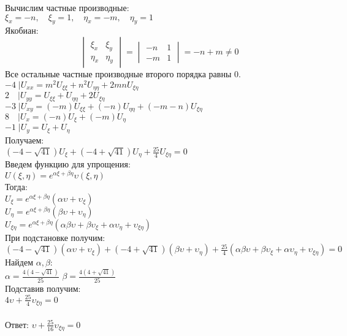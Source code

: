 \documentclass{article}
\begin{document}
	Вычислим частные производные: \\
	$\xi_x=-n, \quad\xi_y=1, \quad \eta_x=-m,\quad \eta_y=1$\\
	Якобиан: \\ 
	\begin{equation}
		\begin{vmatrix}
			\xi_x & \xi_y \\
			\eta_x & \eta_y
		\end{vmatrix}
	    =
		\begin{vmatrix}
			-n & 1 \\
			-m & 1
		\end{vmatrix}
		=
		-n + m
		\neq
		0
	\end{equation}
	Все остальные частные производные второго порядка равны 0.\\
	$ -4\;|U_{xx}=m^2U_{\xi\xi}+n^2U_{\eta\eta}+2mnU_{\xi\eta} $ \\
	$ 2 \quad|U_{yy}=U_{\xi\xi}+U_{\eta\eta}+2U_{\xi\eta} $ \\
	$ -3\;|U_{xy}=(-m)U_{\xi\xi}+(-n)U_{\eta\eta}+(-m-n)U_{\xi\eta} $ \\
	$ 8 \quad|U_x=(-n)U_{\xi}+(-m)U_{\eta} $ \\
	$-1\;|U_y=U_{\xi}+U_{\eta}$ \\
	Получаем: \\
	$ (-4 - \sqrt{41}) U_{\xi} + (-4 + \sqrt{41})U_{\eta} + \frac{25}{4}U_{\xi \eta} = 0 $ \\
	Введем функцию для упрощения: \\
	$U(\xi,\eta)=e^{\alpha\xi +\beta\eta}\upsilon(\xi,\eta)$\\
	Тогда:\\
	$U_{\xi}=e^{\alpha\xi +\beta\eta}(\alpha\upsilon+\upsilon_{\xi})$\\
	$U_{\eta}=e^{\alpha\xi +\beta\eta}(\beta\upsilon+\upsilon_{\eta})$\\
	$U_{\xi \eta}=e^{\alpha\xi +\beta\eta}(\alpha\beta\upsilon+\beta\upsilon_{\xi}+\alpha\upsilon_{\eta}+\upsilon_{\xi\eta})$\\
	При подстановке получим:\\
	$(-4 - \sqrt{41})(\alpha\upsilon+\upsilon_{\xi}) +(-4 + \sqrt{41})(\beta\upsilon+\upsilon_{\eta}) + \frac{25}{4}(\alpha\beta\upsilon+\beta\upsilon_{\xi}+\alpha\upsilon_{\eta}+\upsilon_{\xi\eta}) = 0 $ \\
	Найдем $ \alpha , \beta: $ \\
	$\alpha=\frac{4(4 - \sqrt{41})}{25}$
	$\beta=\frac{4(4 + \sqrt{41})}{25}$\\
	Подставив получим:\\
	$ 4 \upsilon + \frac{25}{4}\upsilon_{\xi\eta} = 0 $\\\\
	Ответ:
	$ \upsilon + \frac{25}{16}\upsilon_{\xi\eta} = 0 $
	
\end{document}

